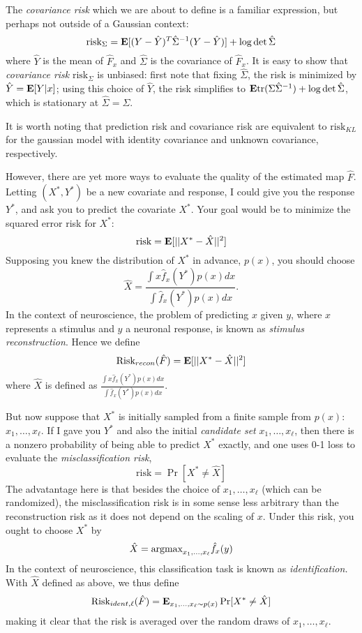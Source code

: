 \documentclass[12pt]{article}
\begin{document}
The \emph{covariance risk} which we are about to define is a familiar
expression, but perhaps not outside of a Gaussian context:
\[
\text{risk}_{\Sigma} = \textbf{E}[(Y - \hat{Y})^T \hat{\Sigma}^{-1} (Y - \hat{Y})] + \log \det \hat{\Sigma}
\]
where $\hat{Y}$ is the mean of $\hat{F}_x$ and $\hat{\Sigma}$ is the
covariance of $\hat{F}_x$. It is easy to show that \emph{covariance risk}
$\text{risk}_{\Sigma}$ is unbiased: first note that fixing
$\hat{\Sigma}$, the risk is minimized by $\hat{Y} = \textbf{E}[Y|x]$; using
this choice of $\hat{Y}$, the risk simplifies to
$\textbf{E}\text{tr}(\Sigma\hat{\Sigma}^{-1}) + \log\det\hat{\Sigma}$, which is
stationary at $\hat{\Sigma} = \Sigma$.

It is worth noting that prediction risk and covariance risk are
equivalent to $\text{risk}_{KL}$ for the gaussian model with identity
covariance and unknown covariance, respectively.

However, there are yet more ways to evaluate the quality of the
estimated map $\hat{F}$.  Letting $(X^*, Y^*)$ be a new covariate and
response, I could give you the response $Y^*$, and ask you to predict the
covariate $X^*$.  Your goal would be to minimize the squared error risk for $X^*$:
\[
\text{risk} = \textbf{E}[||X^* - \hat{X}||^2]
\]
Supposing you knew the distribution of $X^*$ in advance, $p(x)$,
you should choose
\[
\hat{X} = \frac{\int x \hat{f}_x(Y^*) p(x) dx}{\int \hat{f}_x(Y^*) p(x) dx}.
\]
In the context of neuroscience, the problem of predicting $x$ given
$y$, where $x$ represents a stimulus and $y$ a neuronal response, is
known as \emph{stimulus reconstruction}.  Hence we define
\[
\text{Risk}_{recon}(\hat{F}) = \textbf{E}[||X^* - \hat{X}||^2]
\]
where $\hat{X}$ is defined as $\frac{\int x \hat{f}_x(Y^*) p(x)
dx}{\int \hat{f}_x(Y^*) p(x) dx}$.

But now suppose that $X^*$ is initially sampled from a finite sample
from $p(x)$: $x_1,\hdots, x_\ell$.  If I gave you $Y^*$ and also the
initial \emph{candidate set} $x_1,\hdots, x_\ell$, then there is a
nonzero probability of being able to predict $X^*$ exactly, and one uses
0-1 loss to evaluate the \emph{misclassification risk},
\[
\text{risk} = \Pr[X^* \neq \hat{X}]
\]
The advatantage here is that besides the choice of $x_1,\hdots,
x_\ell$ (which can be randomized), the misclassification risk is in
some sense less arbitrary than the reconstruction risk as it does not
depend on the scaling of $x$.  Under this risk, you ought to choose
$X^*$ by
\[
\hat{X} = \text{argmax}_{x_1,\hdots, x_\ell} \hat{f}_x(y)
\]
In the context of neuroscience, this classification task is known as \emph{identification.}
With $\hat{X}$ defined as above, we thus define
\[
\text{Risk}_{ident, \ell}(\hat{F}) = \textbf{E}_{x_1,\hdots, x_\ell \sim p(x)} \Pr[X^* \neq \hat{X}]
\]
making it clear that the risk is averaged over the random draws of $x_1,\hdots, x_\ell$.
\end{document}

